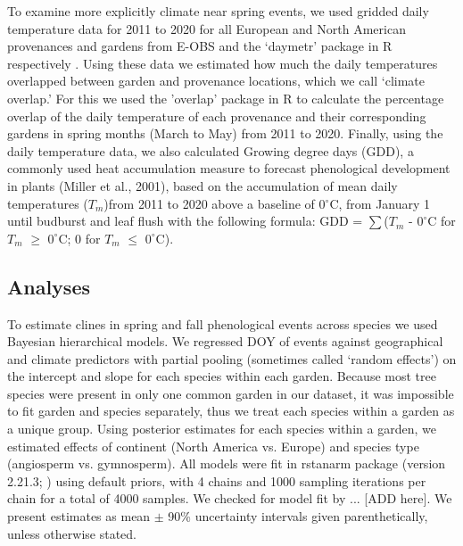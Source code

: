 \documentclass{article}
\begin{document}
To examine more explicitly climate near spring events, we used gridded daily temperature data for 2011 to 2020 for all European and North American provenances and gardens from E-OBS and the `daymetr' package in R respectively \citep{cornes2018,hufkens2018}. Using these data we estimated how much the daily temperatures overlapped between garden and provenance locations, which we call `climate overlap.' For this we used the 'overlap' package in R to calculate the percentage overlap of the daily temperature of each provenance and their corresponding gardens in spring months (March to May) from 2011 to 2020. Finally, using the daily temperature data, we also calculated Growing degree days (GDD), a commonly used heat accumulation measure to forecast phenological development in plants (Miller et al., 2001), based on the accumulation of mean daily temperatures ($T_{m}$)from 2011 to 2020 above a baseline of 0$^{\circ}$C, from January 1 until budburst and leaf flush with the following formula: GDD = $\sum$($T_{m}$ - $0^{\circ}$C for $T_{m}$ $\ge$ $0^{\circ}$C; 0 for $T_{m}$ $\le$ $0^{\circ}$C). %

\subsection{Analyses}
To estimate clines in spring and fall phenological events across species we used Bayesian hierarchical models. We regressed DOY of events against geographical and climate predictors with partial pooling (sometimes called `random effects') on the intercept and slope for each species within each garden. Because most tree species were present in only one common garden in our dataset, it was impossible to fit garden and species separately, thus we treat each species within a garden as a unique group. Using posterior estimates for each species within a garden, we estimated effects of continent (North America vs. Europe) and species type (angiosperm vs. gymnosperm). All models were fit in rstanarm package (version 2.21.3; \citealp{brilleman2018}) using default priors, with 4 chains and 1000 sampling iterations per chain for a total of 4000 samples. We checked for model fit by ... [ADD here]. We present estimates as mean $\pm$ 90\% uncertainty intervals given parenthetically, unless otherwise stated. 
\end{document}
